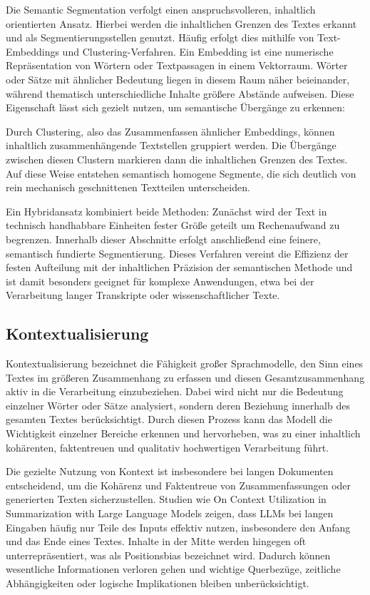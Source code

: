 Die Semantic Segmentation verfolgt einen anspruchsvolleren, inhaltlich orientierten Ansatz. Hierbei werden die inhaltlichen Grenzen des Textes erkannt und als Segmentierungsstellen genutzt. Häufig erfolgt dies mithilfe von Text-Embeddings und Clustering-Verfahren.
Ein Embedding ist eine numerische Repräsentation von Wörtern oder Textpassagen in einem Vektorraum. Wörter oder Sätze mit ähnlicher Bedeutung liegen in diesem Raum näher beieinander, während thematisch unterschiedliche Inhalte größere Abstände aufweisen. Diese Eigenschaft lässt sich gezielt nutzen, um semantische Übergänge zu erkennen\cite{Lo2021}:

Durch Clustering, also das Zusammenfassen ähnlicher Embeddings, können inhaltlich zusammenhängende Textstellen gruppiert werden. Die Übergänge zwischen diesen Clustern markieren dann die inhaltlichen Grenzen des Textes. Auf diese Weise entstehen semantisch homogene Segmente, die sich deutlich von rein mechanisch geschnittenen Textteilen unterscheiden.

Ein Hybridansatz kombiniert beide Methoden: Zunächst wird der Text in technisch handhabbare Einheiten fester Größe geteilt um Rechenaufwand zu begrenzen. Innerhalb dieser Abschnitte erfolgt anschließend eine feinere, semantisch fundierte Segmentierung. Dieses Verfahren vereint die Effizienz der festen Aufteilung mit der inhaltlichen Präzision der semantischen Methode und ist damit besonders geeignet für komplexe Anwendungen, etwa bei der Verarbeitung langer Transkripte oder wissenschaftlicher Texte.

\subsection{Kontextualisierung}
Kontextualisierung bezeichnet die Fähigkeit großer Sprachmodelle, den Sinn eines Textes im größeren Zusammenhang zu erfassen und diesen Gesamtzusammenhang aktiv in die Verarbeitung einzubeziehen. Dabei wird nicht nur die Bedeutung einzelner Wörter oder Sätze analysiert, sondern deren Beziehung innerhalb des gesamten Textes berücksichtigt. Durch diesen Prozess kann das Modell die Wichtigkeit einzelner Bereiche erkennen und hervorheben, was zu einer inhaltlich kohärenten, faktentreuen und qualitativ hochwertigen Verarbeitung führt.

Die gezielte Nutzung von Kontext ist insbesondere bei langen Dokumenten entscheidend, um die Kohärenz und Faktentreue von Zusammenfassungen oder generierten Texten sicherzustellen. Studien wie On Context Utilization in Summarization with Large Language Models \cite{Ravaut2023} zeigen, dass LLMs bei langen Eingaben häufig nur Teile des Inputs effektiv nutzen, insbesondere den Anfang und das Ende eines Textes. Inhalte in der Mitte werden hingegen oft unterrepräsentiert, was als Positionsbias bezeichnet wird. Dadurch können wesentliche Informationen verloren gehen und wichtige Querbezüge, zeitliche Abhängigkeiten oder logische Implikationen bleiben unberücksichtigt.

